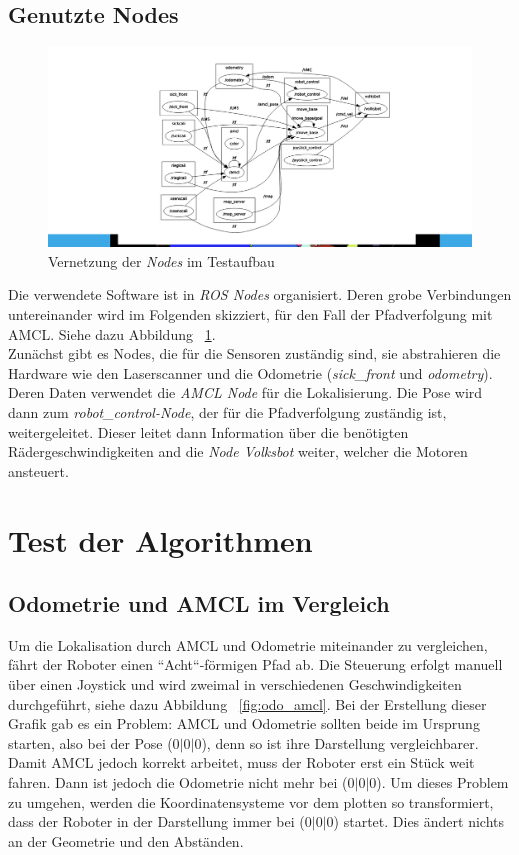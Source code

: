 \documentclass[11pt,a4paper]{article}
\begin{document}
{\subsection{Genutzte Nodes}
{

	\begin{figure}[h]
		\includegraphics[trim=9cm 1cm 7cm 1cm , clip= true,width=\textwidth]{pictures/node_graph.png}
		\caption{Vernetzung der \textit{Nodes} im Testaufbau \label{fig:nodes}}
	\end{figure}
	Die verwendete Software ist in \textit{ROS Nodes} organisiert. Deren grobe Verbindungen untereinander wird im Folgenden skizziert, f\"ur den Fall der Pfadverfolgung mit AMCL. Siehe dazu Abbildung ~\ref{fig:nodes}. 
	\\
	Zun\"achst gibt es Nodes, die f\"ur die Sensoren zust\"andig sind, sie abstrahieren die Hardware wie den Laserscanner und die Odometrie (\textit{sick\_front} und \textit{odometry}). Deren Daten verwendet die \textit{AMCL Node} f\"ur die Lokalisierung. Die Pose wird dann zum \textit{robot\_control-Node}, der f\"ur die Pfadverfolgung zust\"andig ist, weitergeleitet. Dieser leitet dann Information \"uber die ben\"otigten R\"adergeschwindigkeiten and die \textit{Node Volksbot} weiter, welcher die Motoren ansteuert.
	
} 
\newpage
\section{Test der Algorithmen} 
\subsection{Odometrie und AMCL im Vergleich}


	Um die Lokalisation durch AMCL und Odometrie miteinander zu vergleichen, f\"ahrt der Roboter einen ``Acht``-f\"ormigen Pfad ab. Die Steuerung erfolgt manuell \"uber einen Joystick und wird zweimal in verschiedenen Geschwindigkeiten durchgef\"uhrt, siehe dazu Abbildung ~\ref{fig:odo_amcl}. Bei der Erstellung dieser Grafik gab es ein Problem: AMCL und Odometrie sollten beide im Ursprung starten, also bei der Pose (0$|$0$|$0), denn so ist ihre Darstellung vergleichbarer. Damit AMCL jedoch korrekt arbeitet, muss der Roboter erst ein St\"uck weit fahren. Dann ist jedoch die Odometrie nicht mehr bei (0$|$0$|$0). Um dieses Problem zu umgehen, werden die Koordinatensysteme vor dem plotten so transformiert, dass der Roboter in der Darstellung immer bei (0$|$0$|$0) startet. Dies \"andert nichts an der Geometrie und den Abst\"anden.    


}
\end{document}
